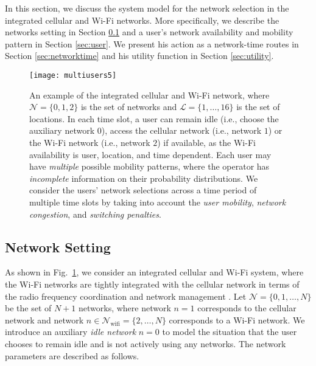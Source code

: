 \documentclass[journal]{IEEEtran}
\begin{document}
	In this section, we discuss the system model for the network selection in the integrated cellular and Wi-Fi networks.
  More specifically, we describe the networks setting in Section \ref{sec:network} and a user's  network availability and mobility pattern in Section \ref{sec:user}.
	We present his action as a network-time routes in Section \ref{sec:networktime} and his utility function in Section \ref{sec:utility}.

\begin{figure}[t]
 \centering
   \texttt{[image: multiusers5]} %
 \caption{An example of the integrated cellular and Wi-Fi network, where $\mathcal{N} = \{0, 1,2\}$ is the set of networks and $\mathcal{L} = \{1,\ldots,16\}$ is the set of locations. In each time slot, a user can remain idle (i.e., choose the auxiliary network $0$), access the cellular network (i.e., network $1$) or the Wi-Fi network (i.e., network $2$) if available, as the Wi-Fi availability is user, location, and time dependent. Each user may have \emph{multiple} possible mobility patterns, where the operator has \emph{incomplete} information on their probability distributions. We consider the users' network selections across a time period of multiple time slots by taking into account the \emph{user mobility}, \emph{network congestion}, and \emph{switching penalties}.} %
\label{fig:network}
\end{figure}




\subsection{Network Setting} \label{sec:network}

  As shown in Fig.~\ref{fig:network}, we consider an integrated cellular and Wi-Fi system, where the Wi-Fi networks are tightly integrated with the cellular network in terms of the radio frequency coordination and network management \cite{ericsson_wi12}.	
  Let $\mathcal{N} = \{0,1,\ldots,N\}$ be the set of $N + 1$ networks, where network $n = 1$ corresponds to the cellular network and network $n \in \mathcal{N}_{\text{wifi}} = \{2,\ldots,N\}$ corresponds to a Wi-Fi network.  We introduce an auxiliary \emph{idle network} $n = 0$ to model the situation that the user chooses to remain idle and is not actively using any networks.
  The network parameters are described as follows.
\end{document}
